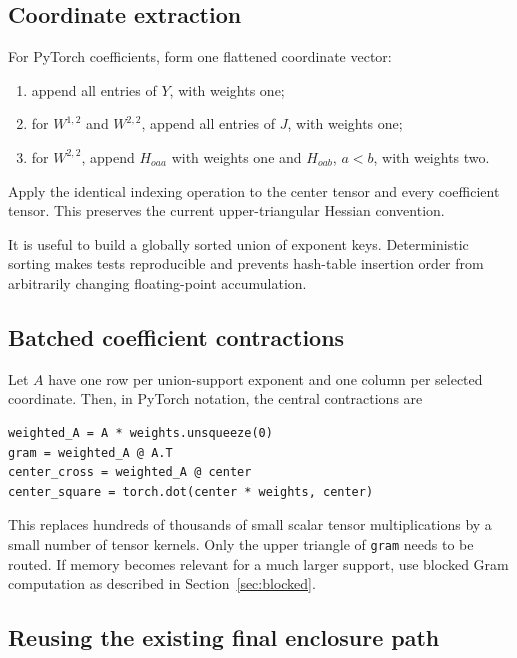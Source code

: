 \documentclass[11pt]{article}
\begin{document}
\subsection{Coordinate extraction}

For PyTorch coefficients, form one flattened coordinate vector:
\begin{enumerate}[label=\arabic*.]
    \item append all entries of \(Y\), with weights one;
    \item for \(W^{1,2}\) and \(W^{2,2}\), append all entries of \(J\), with
    weights one;
    \item for \(W^{2,2}\), append \(H_{oaa}\) with weights one and
    \(H_{oab}\), \(a<b\), with weights two.
\end{enumerate}
Apply the identical indexing operation to the center tensor and every
coefficient tensor.  This preserves the current upper-triangular Hessian
convention.

It is useful to build a globally sorted union of exponent keys.  Deterministic
sorting makes tests reproducible and prevents hash-table insertion order from
arbitrarily changing floating-point accumulation.

\subsection{Batched coefficient contractions}

Let \(A\) have one row per union-support exponent and one column per selected
coordinate.  Then, in PyTorch notation, the central contractions are
\begin{verbatim}
weighted_A = A * weights.unsqueeze(0)
gram = weighted_A @ A.T
center_cross = weighted_A @ center
center_square = torch.dot(center * weights, center)
\end{verbatim}
This replaces hundreds of thousands of small scalar tensor multiplications by
a small number of tensor kernels.  Only the upper triangle of \texttt{gram}
needs to be routed.  If memory becomes relevant for a much larger support, use
blocked Gram computation as described in Section~\ref{sec:blocked}.

\subsection{Reusing the existing final enclosure path}
\end{document}
